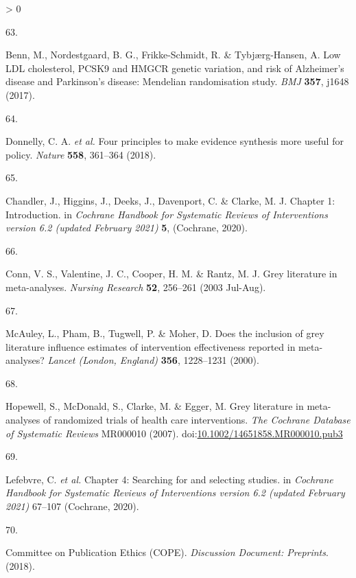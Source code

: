 \documentclass[a4paper, twoside]{templates/ociamthesis}
\newlength{\cslhangindent}
\newlength{\csllabelwidth}
\newenvironment{CSLReferences}[3] %
 {%
  \setlength{\parindent}{0pt}
  \ifodd #1 \everypar{\setlength{\hangindent}{\cslhangindent}}\ignorespaces\fi
  \ifnum #2 > 0
  \setlength{\parskip}{#2\baselineskip}
  \fi
 }%
 {}
\newcommand{\CSLLeftMargin}[1]{\parbox[t]{\maxof{\widthof{#1}}{\csllabelwidth}}{#1}}
\newcommand{\CSLRightInline}[1]{\parbox[t]{\linewidth - \csllabelwidth}{#1}}
\begin{document}
\begin{CSLReferences}{0}{0}
\leavevmode\hypertarget{ref-benn2017}{}%
\CSLLeftMargin{63. }
\CSLRightInline{Benn, M., Nordestgaard, B. G., Frikke-Schmidt, R. \& Tybjærg-Hansen, A. Low {LDL} cholesterol, {PCSK9} and {HMGCR} genetic variation, and risk of {Alzheimer}'s disease and {Parkinson}'s disease: {Mendelian} randomisation study. \emph{BMJ} \textbf{357}, j1648 (2017).}

\leavevmode\hypertarget{ref-donnelly2018a}{}%
\CSLLeftMargin{64. }
\CSLRightInline{Donnelly, C. A. \emph{et al.} Four principles to make evidence synthesis more useful for policy. \emph{Nature} \textbf{558}, 361--364 (2018).}

\leavevmode\hypertarget{ref-chandler2019chapter}{}%
\CSLLeftMargin{65. }
\CSLRightInline{Chandler, J., Higgins, J., Deeks, J., Davenport, C. \& Clarke, M. J. Chapter 1: {Introduction}. in \emph{Cochrane {Handbook} for {Systematic Reviews} of {Interventions} version 6.2 (updated {February} 2021)} \textbf{5}, ({Cochrane}, 2020).}

\leavevmode\hypertarget{ref-conn2003}{}%
\CSLLeftMargin{66. }
\CSLRightInline{Conn, V. S., Valentine, J. C., Cooper, H. M. \& Rantz, M. J. Grey literature in meta-analyses. \emph{Nursing Research} \textbf{52}, 256--261 (2003 Jul-Aug).}

\leavevmode\hypertarget{ref-mcauley2000}{}%
\CSLLeftMargin{67. }
\CSLRightInline{McAuley, L., Pham, B., Tugwell, P. \& Moher, D. Does the inclusion of grey literature influence estimates of intervention effectiveness reported in meta-analyses? \emph{Lancet (London, England)} \textbf{356}, 1228--1231 (2000).}

\leavevmode\hypertarget{ref-hopewell2007}{}%
\CSLLeftMargin{68. }
\CSLRightInline{Hopewell, S., McDonald, S., Clarke, M. \& Egger, M. Grey literature in meta-analyses of randomized trials of health care interventions. \emph{The Cochrane Database of Systematic Reviews} MR000010 (2007). doi:\href{https://doi.org/10.1002/14651858.MR000010.pub3}{10.1002/14651858.MR000010.pub3}}

\leavevmode\hypertarget{ref-lefebvre2019searching}{}%
\CSLLeftMargin{69. }
\CSLRightInline{Lefebvre, C. \emph{et al.} Chapter 4: {Searching} for and selecting studies. in \emph{Cochrane {Handbook} for {Systematic Reviews} of {Interventions} version 6.2 (updated {February} 2021)} 67--107 ({Cochrane}, 2020).}

\leavevmode\hypertarget{ref-committeeonpublicationethicscope2018}{}%
\CSLLeftMargin{70. }
\CSLRightInline{Committee on Publication Ethics (COPE). \emph{Discussion {Document}: {Preprints}}. (2018).}


\end{CSLReferences}
\end{document}
